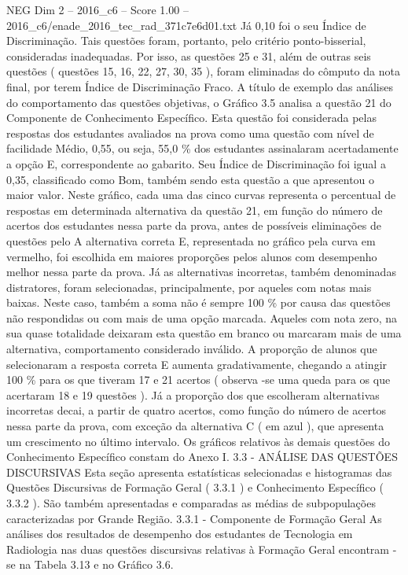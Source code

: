 \begin{textsample}{NEG Dim 2 – 2016\_c6 – Score 1.00 – 2016\_c6/enade\_2016\_tec\_rad\_371c7e6d01.txt}
Já 0,10 foi o seu Índice de Discriminação.
Tais questões foram, portanto, pelo critério ponto-bisserial, consideradas inadequadas.
Por isso, as questões 25 e 31, além de outras seis questões ( questões 15, 16, 22, 27, 30, 35 ), foram eliminadas do cômputo da nota final, por terem Índice de Discriminação Fraco.
A título de exemplo das análises do comportamento das questões objetivas, o Gráfico 3.5 analisa a questão 21 do Componente de Conhecimento Específico.
Esta questão foi considerada pelas respostas dos estudantes avaliados na prova como uma questão com nível de facilidade Médio, 0,55, ou seja, 55,0 \% dos estudantes assinalaram acertadamente a opção E, correspondente ao gabarito.
Seu Índice de Discriminação foi igual a 0,35, classificado como Bom, também sendo esta questão a que apresentou o maior valor.
Neste gráfico, cada uma das cinco curvas representa o percentual de respostas em determinada alternativa da questão 21, em função do número de acertos dos estudantes nessa parte da prova, antes de possíveis eliminações de questões pelo A alternativa correta E, representada no gráfico pela curva em vermelho, foi escolhida em maiores proporções pelos alunos com desempenho melhor nessa parte da prova.
Já as alternativas incorretas, também denominadas distratores, foram selecionadas, principalmente, por aqueles com notas mais baixas.
Neste caso, também a soma não é sempre 100 \% por causa das questões não respondidas ou com mais de uma opção marcada.
Aqueles com nota zero, na sua quase totalidade deixaram esta questão em branco ou marcaram mais de uma alternativa, comportamento considerado inválido.
A proporção de alunos que selecionaram a resposta correta E aumenta gradativamente, chegando a atingir 100 \% para os que tiveram 17 e 21 acertos ( observa -se uma queda para os que acertaram 18 e 19 questões ).
Já a proporção dos que escolheram alternativas incorretas decai, a partir de quatro acertos, como função do número de acertos nessa parte da prova, com exceção da alternativa C ( em azul ), que apresenta um crescimento no último intervalo.
Os gráficos relativos às demais questões do Conhecimento Específico constam do Anexo I. 3.3 - ANÁLISE DAS QUESTÕES DISCURSIVAS Esta seção apresenta estatísticas selecionadas e histogramas das Questões Discursivas de Formação Geral ( 3.3.1 ) e Conhecimento Específico ( 3.3.2 ).
São também apresentadas e comparadas as médias de subpopulações caracterizadas por Grande Região. 3.3.1 - Componente de Formação Geral As análises dos resultados de desempenho dos estudantes de Tecnologia em Radiologia nas duas questões discursivas relativas à Formação Geral encontram -se na Tabela 3.13 e no Gráfico 3.6.

\end{textsample}
